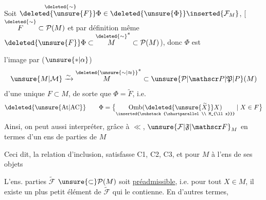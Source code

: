 \quad Soit $\overset{\deleted{\sim}}{\deleted{\unsure{F}}\Phi}\in\deleted{\unsure{\Phi}}\inserted{\mathcal F_M}$, [ $\overset{\deleted{\sim}}{F}\subset\mathcal P(M)$ et par définition même $\deleted{\unsure{F}}\Phi\subset\overset{\deleted{\sim}}{M}^{*}\subset\mathcal P(M)$), donc $\Phi$ est

l'image par  ($\unsure{*|\alpha}$)
\[
 \unsure{M|\mathcal M}\xrightarrow{\sim}\overset{\deleted{\unsure{\sim|\approx}}}{M}^{*}\subset\unsure{\mathcal P|\mathscr P|\mathfrak P|P}(M)
\]
d'une unique  $F\subset M$, de sorte que $\Phi=\widetilde F$, i.e.
\[
 \deleted{\unsure{\mathrm{At}|\mathrm{AC}}}\qquad
 \Phi=\bigl\{\underset{\inserted{\substack{\shortparallel\\ M_{\ll x}}}}
 {\mathrm{Omb}(\deleted{\unsure{\widetilde X}}X)}\mid X\in F\bigr\}
\]
Ainsi, on peut aussi interpréter, grâce à $\ll$, $\unsure{\mathcal F|\mathfrak F|\mathscr F}_M$ en termes d'un  ens de parties  de $M$

Ceci dit,  
    la relation d'inclusion, satisfasse C1, C2, C3,
et  pour $M$  à l'ens de ses objets 

\quad {} L'ens.  parties $\widetilde{\mathcal F}$  $\unsure{\subset}\mathcal P(M)$ soit \uline{préadmissible}, i.e. pour tout $X\in M$, il existe un plus petit élément de $\widetilde{\mathcal F}$ qui le contienne. En d'autres termes,

